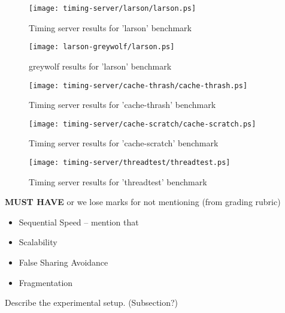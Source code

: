\documentclass{article}
\begin{document}
\begin{figure}[h]
    \centering
    \texttt{[image: timing-server/larson/larson.ps]}
    \caption{Timing server results for 'larson' benchmark}
    \label{fig:t-larson}
\end{figure}

\begin{figure}[h]
    \centering
    \texttt{[image: larson-greywolf/larson.ps]}
    \caption{greywolf results for 'larson' benchmark}
    \label{fig:g-larson}
\end{figure}

\begin{figure}[h]
    \centering
    \texttt{[image: timing-server/cache-thrash/cache-thrash.ps]}
    \caption{Timing server results for 'cache-thrash' benchmark}
    \label{fig:t-cache-thrash}
\end{figure}

\begin{figure}[h]
    \centering
    \texttt{[image: timing-server/cache-scratch/cache-scratch.ps]}
    \caption{Timing server results for 'cache-scratch' benchmark}
    \label{fig:t-cache-scratch}
\end{figure}

\begin{figure}[h]
    \centering
    \texttt{[image: timing-server/threadtest/threadtest.ps]}
    \caption{Timing server results for 'threadtest' benchmark}
    \label{fig:t-threadtest}
\end{figure}

\textbf{MUST HAVE} or we lose marks for not mentioning (from grading rubric)
\begin{itemize}
	\item Sequential Speed -- mention that
	\item Scalability
	\item False Sharing Avoidance
	\item Fragmentation
\end{itemize}

Describe the experimental setup. (Subsection?)
\end{document}
